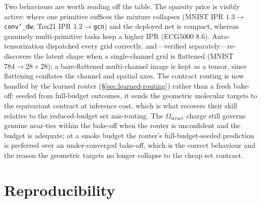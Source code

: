 \documentclass[11pt]{article}
\newcommand{\allowbreakhere}{\discretionary{}{}{}}
\newcommand{\code}[1]{\texttt{\def\_{\char`_\allowbreakhere}#1}}
\begin{document}
Two behaviours are worth reading off the table. The sparsity price is visibly active: where one primitive
suffices the mixture collapses (MNIST IPR $1.3\to$\code{conv\_dw}; Tox21 IPR $1.2\to$\code{gcn}) and the
deployed net is compact, whereas genuinely multi-primitive tasks keep a higher IPR (ECG5000 $8.6$).
Auto-tensorization dispatched every grid correctly, and---verified separately---re-discovers the latent
shape when a single-channel grid is flattened (MNIST $784\to28\times28$); a bare-flattened multi-channel
image is kept as a tensor, since flattening conflates the channel and spatial axes. The contract routing
is now handled by the learned router (\S\ref{sec:learned-routing}) rather than a fresh bake-off: seeded
from full-budget outcomes, it sends the geometric molecular targets to the equivariant contract at
inference cost, which is what recovers their skill relative to the reduced-budget set mis-routing. The
$\Omega_{\mathrm{struct}}$ charge still governs genuine near-ties within the bake-off when the router is
unconfident and the budget is adequate; at a smoke budget the router's full-budget-seeded prediction is
preferred over an under-converged bake-off, which is the correct behaviour and the reason the geometric
targets no longer collapse to the cheap set contract.


\section{Reproducibility}
\label{sec:repro}
\end{document}
